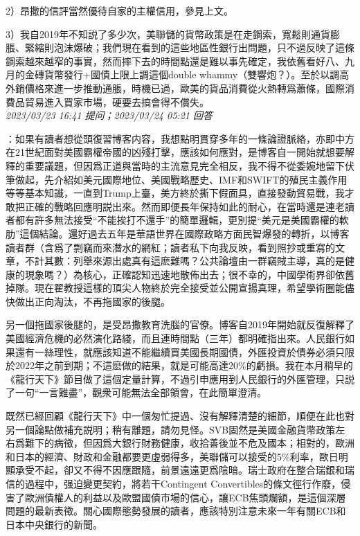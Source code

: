\documentclass[twocolumn]{ctexart}
\begin{document}
2）昂撒的信評當然優待自家的主權信用，參見上文。

3）我自2019年不知説了多少次，美聯儲的貨幣政策是在走鋼索，寬鬆則通貨膨脹、緊縮則泡沫爆破；我們現在看到的這些地區性銀行出問題，只不過反映了這條鋼索越來越窄的事實，然而摔下去的時間點還是難以事先確定，我依舊看好八、九月的金磚貨幣發行+國債上限上調這個double whammy（雙響炮？）。至於以調高外銷價格來進一步推動通脹，時機已過，歐美的貨品消費從火熱轉爲蕭條，國際消費品貿易進入買家市場，硬要去搞會得不償失。
\\

\textit{\hfill\noindent\small 2023/03/23 16:41 提问；2023/03/24 05:21 回答}

：如果有讀者想從頭復習博客内容，我想點明貫穿多年的一條論證脈絡，亦即中方在21世紀面對美國霸權帝國的凶殘打擊，應該如何應對，是博客自一開始就想要解釋的重要議題，但因爲正道與當時的主流意見完全相反，我不得不從委婉地留下伏筆做起，先介紹如美元國際地位、美國戰略歷史、IMF和SWIFT的殖民主義作用等等基本知識，一直到Trump上臺，美方終於撕下假面具，直接發動貿易戰，我才敢把正確的戰略回應明説出來。然而即便長年保持如此的耐心，在當時還是連老讀者都有許多無法接受“不能挨打不還手”的簡單邏輯，更別提“美元是美國霸權的軟肋”這個結論。還好過去五年是華語世界在國際政略方面民智爆發的轉折，以博客讀者群（含爲了剽竊而來潛水的網紅；讀者私下向我反映，看到照抄或重寫的文章，不計其數：列舉來源出處真有這麽難嗎？公共論壇由一群竊賊主導，真的是健康的現象嗎？）為核心，正確認知迅速地散佈出去；很不幸的，中國學術界卻依舊掉隊。現在翟教授這樣的頂尖人物終於完全接受並公開宣揚真理，希望學術圈能儘快做出正向淘汰，不再拖國家的後腿。

另一個拖國家後腿的，是受昂撒教育洗腦的官僚。博客自2019年開始就反復解釋了美國經濟危機的必然演化路綫，而且連時間點（三年）都明確指出來。人民銀行如果還有一絲理性，就應該知道不能繼續買美國長期國債，外匯投資於債券必須只限於2022年之前到期；不這麽做的結果，就是可能高達20\%的虧損。我在本月稍早的《龍行天下》節目做了這個定量計算，不過引申應用到人民銀行的外匯管理，只説了一句“一言難盡”，觀衆可能無法全部領會，在此簡單澄清。

既然已經回顧《龍行天下》中一個匆忙提過、沒有解釋清楚的細節，順便在此也對另一個論點做補充説明；稍有離題，請勿見怪。SVB固然是美國金融貨幣政策左右爲難下的病徵，但因爲大銀行財務健康，收拾善後並不危及國本；相對的，歐洲和日本的經濟、財政和金融都要更虛弱得多，美聯儲可以接受的5\%利率，歐日明顯承受不起，卻又不得不因應跟隨，前景遠遠更爲陰暗。瑞士政府在整合瑞銀和瑞信的過程中，强迫變更契約，將若干Contingent Convertibles的條文徑行作廢，侵害了歐洲債權人的利益以及歐盟國債市場的信心，讓ECB焦頭爛額，是這個深層問題的最新表徵。關心國際態勢發展的讀者，應該特別注意未來一年有關ECB和日本中央銀行的新聞。
\\
\end{document}
